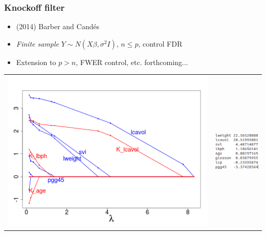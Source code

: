 \documentclass{beamer}
\begin{document}
\begin{frame}
\frametitle{Knockoff filter}
\begin{itemize}
\item (2014) Barber and Cand\'{e}s
\item \emph{Finite sample} $Y \sim N(X\beta, \sigma^2 I)$, $n \leq p$, control FDR
\item Extension to $p > n$, FWER control, etc. forthcoming...
\end{itemize}
\begin{center}
\begin{tabular}{cc}
\includegraphics[scale = 0.25]{knockoff.png} &
\includegraphics[scale = 0.5, trim=0in -1in 0.5in 0in, clip]{knockoff2.png}
\end{tabular}
\end{center}
\end{frame}
\end{document}
